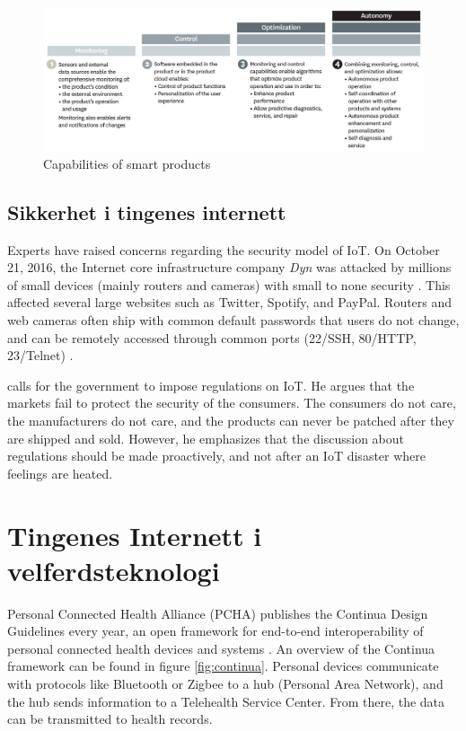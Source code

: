 \begin{figure}
\includegraphics[width=1.1\textwidth,center]{fig/harvard_capabilities}
\caption{Capabilities of smart products \citep{iot_harvard_smart}}
\label{fig:iot_harvard_capabilities}
\end{figure}


\subsection{Sikkerhet i tingenes internett}
Experts have raised concerns regarding the security model of IoT. On October 21, 2016, the Internet core
infrastructure company \textit{Dyn} was attacked by millions of small devices (mainly routers and cameras)
with small to none security \citep{iot_attack_ddos}. This affected several large websites such as Twitter,
Spotify, and PayPal. Routers and web cameras often ship with common default passwords that users
do not change, and can be remotely accessed through common ports (22/SSH, 80/HTTP, 23/Telnet)
\citep{iot_mirai_botnet}. 

\citet{iot_schneier_regulation} calls for the government to impose regulations on IoT. He argues that
the markets fail to protect the security of the consumers. The consumers do not care, the manufacturers
do not care, and the products can never be patched after they are shipped and sold. However,
he emphasizes that the discussion about regulations should be made proactively, and not
after an IoT disaster where feelings are heated.

\section{Tingenes Internett i velferdsteknologi}
Personal Connected Health Alliance (PCHA) publishes the Continua Design Guidelines every year,
an open framework for end-to-end interoperability of personal connected health devices and systems \citep{continua_guidelines}.
An overview of the Continua framework can be found in figure \ref{fig:continua}. Personal devices
communicate with protocols like Bluetooth or Zigbee to a hub (Personal Area Network), and the hub sends information
to a Telehealth Service Center. From there, the data can be transmitted to health records.


